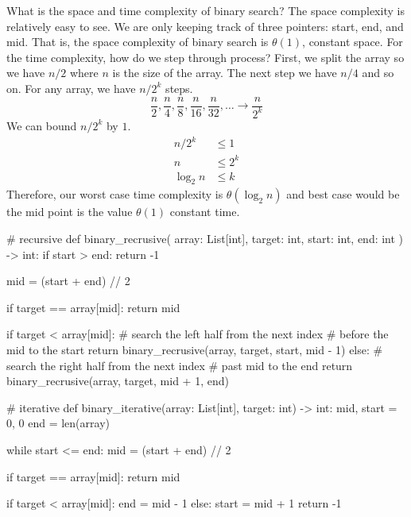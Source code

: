 \documentclass[12pt,dvipsnames,svgnames,x11names]{article}
\begin{document}
What is the space and time complexity of binary search? The space complexity is relatively easy to see. 
We are only keeping track of three pointers: start, end, and mid. That is, the space complexity of binary
search is \(\theta(1)\), constant space. For the time complexity, how do we step through process? First, 
we split the array so we have \(n / 2\) where \(n\) is the size of the array. The next step we have \(n / 4\)
and so on. For any array, we have \(n / 2^k\) steps.
\[
	\frac{n}{2}, \frac{n}{4}, \frac{n}{8}, \frac{n}{16}, \frac{n}{32}, \ldots\rightarrow \frac{n}{2^k}
\]
We can bound \(n / 2^k\) by \(1\).
\begin{align*}
	n / 2^k & \leq 1\\
	n & \leq 2^k \\
	\log_2 n & \leq k
\end{align*}
Therefore, our worst case time complexity is \(\theta(\log_2 n)\) and best case would be the mid point is
the value \(\theta(1)\) constant time.
\begin{python}
# recursive
def binary_recrusive(
		array: List[int], 
		target: int, 
		start: int, 
		end: int
		) -> int:
  if start > end:
    return -1
		
  mid = (start + end) // 2
	
  if target == array[mid]:
	return mid
		
  if target < array[mid]:
	# search the left half from the next index 
	# before the mid to the start
	return binary_recrusive(array, target, start, mid - 1)
  else:
	# search the right half from the next index 
	# past mid to the end
	return binary_recrusive(array, target, mid + 1, end)
	
	
# iterative
def binary_iterative(array: List[int], target: int) -> int:
  mid, start = 0, 0
  end = len(array)
  
  while start <= end:
    mid = (start + end) // 2
    
    if target == array[mid]:
      return mid
      
    if target < array[mid]:
      end = mid - 1
    else:
      start = mid + 1
  return -1
\end{python}
\end{document}
